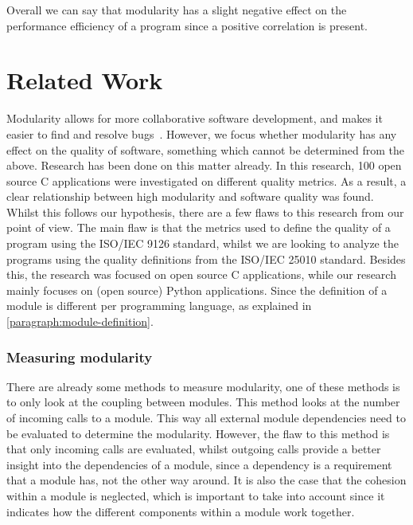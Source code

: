 \documentclass[twoside]{uva-inf-bachelor-thesis}
\begin{document}
Overall we can say that modularity has a slight negative effect on the performance efficiency of a program since a positive correlation is present. 

\chapter{Related Work}
Modularity allows for more collaborative software development, and makes it easier to find and resolve bugs~\cite{LinuxKernel,lee2000linux}. However, we focus whether modularity has any effect on the quality of software, something which cannot be determined from the above. Research has been done on this matter already\cite{stamelos2002code}. In this research, 100 open source C applications were investigated on different quality metrics. As a result, a clear relationship between high modularity and software quality was found. Whilst this follows our hypothesis, there are a few flaws to this research from our point of view. The main flaw is that the metrics used to define the quality of a program using the ISO/IEC 9126 standard\cite{ISO9126}, whilst we are looking to analyze the programs using the quality definitions from the ISO/IEC 25010 standard\cite{ISO25010}. Besides this, the research was focused on open source C applications, while our research mainly focuses on (open source) Python applications. Since the definition of a module is different per programming language, as explained in \autoref{paragraph:module-definition}.

\subsection*{Measuring modularity}
There are already some methods to measure modularity\cite{BetterCodeHub,visser2016building,emanuel2013modularity}, one of these methods is to only look at the coupling between modules\cite{BetterCodeHub,visser2016building}. This method looks at the number of incoming calls to a module. This way all external module dependencies need to be evaluated to determine the modularity. However, the flaw to this method is that only incoming calls are evaluated, whilst outgoing calls provide a better insight into the dependencies of a module, since a dependency is a requirement that a module has, not the other way around. It is also the case that the cohesion within a module is neglected, which is important to take into account since it indicates how the different components within a module work together.
\end{document}
